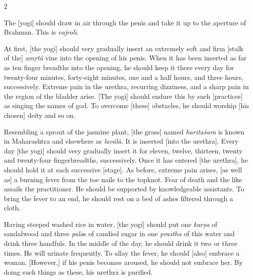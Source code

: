 \begin{nohyp}
\begin{multicols}{2}
\begin{eng}

The [yogi] should draw in air through the penis and take it up to the aperture of Brahman. This is \textit{vajrolī}.
\vskip 7pt


At first, [the yogi] should very gradually insert an extremely soft and firm [stalk of the] \textit{amṛtā} vine into the opening of his penis. When it has been inserted as far as ten finger breadths into the opening, he should keep it there every day for twenty-four minutes, forty-eight minutes, one and a half hours, and three hours, successively. Extreme pain in the urethra, recurring dizziness, and a sharp pain in the region of the bladder arise. [The yogi] should endure this by such [practices] as singing the names of god. To overcome [these] obstacles, he should worship [his chosen] deity and so on.
 
Resembling a sprout of the jasmine plant, [the grass] named \textit{haritaśara} is known in Maharashtra and elsewhere as \textit{lavālā}. It is inserted [into the urethra]. Every day [the yogi] should very gradually insert it for eleven, twelve, thirteen, twenty and twenty-four fingerbreadths, successively. Once it has entered [the urethra], he should hold it at each successive [stage]. As before, extreme pain arises, [as well as] a burning fever from the toe nails to the topknot. Fear of death and the like assails the practitioner. He should be supported by knowledgeable assistants. To bring the fever to an end, he should rest on a bed of ashes filtered through a cloth. 

Having steeped washed rice in water, [the yogi] should put one \textit{karṣa} of sandalwood and three \textit{pala}s of candied sugar in one \textit{prastha} of this water and drink three handfuls. In the middle of the day, he should drink it two or three times. He will urinate frequently.  To allay the fever, he should [also] embrace a woman. [However,] if his penis becomes aroused, he should not embrace her.  By doing such things as these, his urethra is purified.


\end{eng}
\end{multicols}
\end{nohyp}
